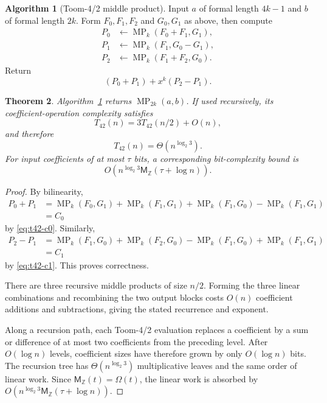 \documentclass[11pt]{book}
\newtheorem{theorem}{Theorem}[section]
\theoremstyle{definition}
\newtheorem{algorithm}[theorem]{Algorithm}
\newcommand{\ZZ}{\mathbb Z}
\newcommand{\MZ}{\mathsf M_{\ZZ}}
\begin{document}
\begin{algorithm}[Toom-4/2 middle product]\label{alg:middle-toom42}
Input $a$ of formal length $4k-1$ and $b$ of formal length $2k$.
Form $F_0,F_1,F_2$ and $G_0,G_1$ as above, then compute
\begin{align*}
 P_0&\leftarrow\operatorname{MP}_k(F_0+F_1,G_1),\\
 P_1&\leftarrow\operatorname{MP}_k(F_1,G_0-G_1),\\
 P_2&\leftarrow\operatorname{MP}_k(F_1+F_2,G_0).
\end{align*}
Return
\[
 (P_0+P_1)+x^k(P_2-P_1).
\]
\end{algorithm}

\begin{theorem}\label{thm:middle-toom42}
Algorithm~\ref{alg:middle-toom42} returns
$\operatorname{MP}_{2k}(a,b)$.  If used recursively, its coefficient-operation
complexity satisfies
\[
 T_{42}(n)=3T_{42}(n/2)+O(n),
\]
and therefore
\[
 T_{42}(n)=\Theta\!\left(n^{\log_2 3}\right).
\]
For input coefficients of at most $\tau$ bits, a corresponding bit-complexity
bound is
\[
 O\!\left(n^{\log_2 3}\MZ(\tau+\log n)\right).
\]
\end{theorem}

\begin{proof}
By bilinearity,
\begin{align*}
 P_0+P_1
 &=\operatorname{MP}_k(F_0,G_1)
   +\operatorname{MP}_k(F_1,G_1)
   +\operatorname{MP}_k(F_1,G_0)
   -\operatorname{MP}_k(F_1,G_1)\\
 &=C_0
\end{align*}
by \eqref{eq:t42-c0}.  Similarly,
\begin{align*}
 P_2-P_1
 &=\operatorname{MP}_k(F_1,G_0)
   +\operatorname{MP}_k(F_2,G_0)
   -\operatorname{MP}_k(F_1,G_0)
   +\operatorname{MP}_k(F_1,G_1)\\
 &=C_1
\end{align*}
by \eqref{eq:t42-c1}.  This proves correctness.

There are three recursive middle products of size $n/2$.  Forming the three
linear combinations and recombining the two output blocks costs $O(n)$
coefficient additions and subtractions, giving the stated recurrence and
exponent.

Along a recursion path, each Toom-4/2 evaluation replaces a coefficient by a
sum or difference of at most two coefficients from the preceding level.
After $O(\log n)$ levels, coefficient sizes have therefore grown by only
$O(\log n)$ bits.  The recursion tree has
$\Theta(n^{\log_2 3})$ multiplicative leaves and the same order of linear
work.  Since $\MZ(t)=\Omega(t)$, the linear work is absorbed by
$O(n^{\log_2 3}\MZ(\tau+\log n))$.
\end{proof}
\end{document}
